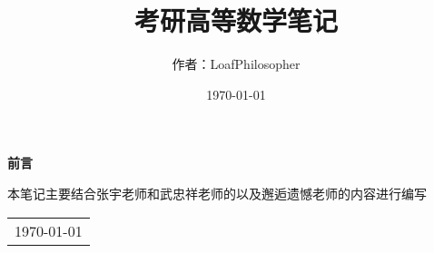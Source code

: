 \title{{\Huge{\textbf{考研高等数学笔记}}}}
\author{作者：LoafPhilosopher }
\date{\today}
\maketitle                   %
\thispagestyle{empty}        %
\begin{center}
	\Huge\textbf{前言}
\end{center}

本笔记主要结合张宇老师和武忠祥老师的以及邂逅遗憾老师的内容进行编写
\begin{flushright}
	\begin{tabular}{c}
		\today \newline 
	\end{tabular}
\end{flushright}

\newpage                      %
\pagestyle{plain}             %
\setcounter{page}{1}          %

\begin{spacing}{1.5}
	\tableofcontents
\end{spacing}           %
\newpage                      %
\pagestyle{plain}
\setcounter{page}{1}          %
